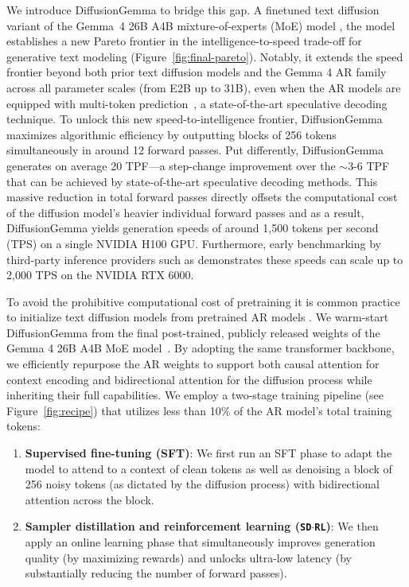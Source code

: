 \documentclass[11pt, a4paper, logo, copyright, gdm]{google}
\newcommand{\sdrl}{\texttt{{\small SD$\cdot$RL}}\xspace}
\begin{document}
We introduce DiffusionGemma to bridge this gap. A finetuned text diffusion variant of the Gemma~4 26B A4B mixture-of-experts (MoE)
model \citep{gemmateam2026gemma4technicalreport}, the model establishes a new Pareto frontier in the intelligence-to-speed trade-off for generative text modeling (Figure~\ref{fig:final-pareto}). Notably, it extends the speed frontier beyond both prior text diffusion models and the Gemma 4 AR family across all parameter scales (from E2B up to 31B), even when the AR models are equipped with multi-token prediction~\citep[MTP,][]{google2026mtpgemma4, deepseekai2024deepseekv3}, a state-of-the-art speculative decoding technique. To unlock this new speed-to-intelligence frontier, DiffusionGemma maximizes algorithmic efficiency by outputting blocks of 256 tokens simultaneously in around 12 forward passes. Put differently, DiffusionGemma generates on average 20 TPF---a step-change improvement over the $\sim$3-6 TPF that can be achieved by state-of-the-art speculative decoding methods. This massive reduction in total forward passes directly offsets the computational cost of the diffusion model's heavier individual forward passes and as a result, DiffusionGemma yields generation speeds of around 1,500 tokens per second (TPS) on a single NVIDIA H100 GPU. Furthermore, early benchmarking by third-party inference providers such as \citet{unsloth} demonstrates these speeds can scale up to 2,000 TPS on the NVIDIA RTX 6000.



To avoid the prohibitive computational cost of pretraining it is common practice to initialize text diffusion models from pretrained AR models \citep{han2024transfer,Gong2024ar2diff}. We warm-start DiffusionGemma from the final post-trained, publicly released weights of the Gemma 4 26B A4B MoE model~\citep{gemmateam2026gemma4technicalreport}. By adopting the same transformer backbone, we efficiently repurpose the AR weights to support both causal attention for context encoding and bidirectional attention for the diffusion process while inheriting their full capabilities. We employ a two-stage training pipeline (see Figure~\ref{fig:recipe}) that utilizes less than 10\% of the AR model’s total training tokens:

\begin{enumerate}[topsep=0pt]
    \item \textbf{Supervised fine-tuning (SFT)}: We first run an SFT phase to adapt the model to attend to a context of clean tokens as well as denoising a block of 256 noisy tokens (as dictated by the diffusion process) with bidirectional attention across the block.
    \item \textbf{Sampler distillation and reinforcement learning (\sdrl)}: We then apply an online learning phase that simultaneously improves generation quality (by maximizing rewards) and unlocks ultra-low latency (by substantially reducing the number of forward passes).
\end{enumerate}
\end{document}
